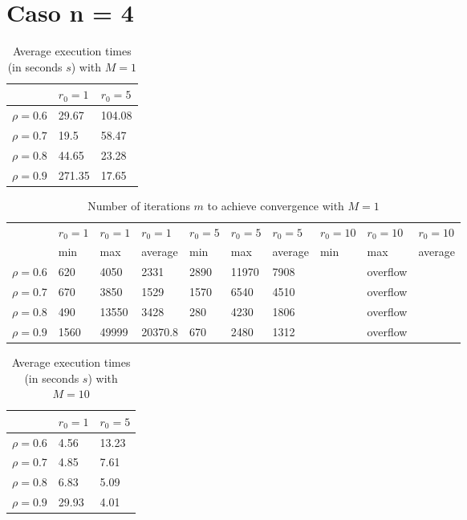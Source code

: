 \documentclass[a4paper,11pt,openright]{report}
\begin{document}
\section*{Caso n = 4} 
\begin{table}[H]
\centering
\addtolength{\leftskip}{-1.5cm}
\addtolength{\rightskip}{-1.5cm}
\begin{tabular}{|c|ll|}
\hline
$ $ & $r_0 = 1$ & $r_0 = 5$ \\
\hline
$\rho = 0.6$ & 29.67 & 104.08 \\

$\rho = 0.7$ & 19.5 & 58.47 \\

$\rho = 0.8$ & 44.65 & 23.28 \\

$\rho = 0.9$ & 271.35 & 17.65 \\
\hline
\end{tabular}
\caption{Average execution
 times (in seconds $s$) with $M = 1$}
\end{table}
\begin{table}[H]
\centering
\addtolength{\leftskip}{-1.5cm}
\addtolength{\rightskip}{-1.5cm}
\begin{tabular}{|c|lllllllll|}
\hline
$ $ & $r_0 = 1$ & $r_0 = 1$ & $r_0 = 1$ & $r_0 = 5$ & $r_0 = 5$ & $r_0 = 5$ & $r_0 = 10$ & $r_0 = 10$ & $r_0 = 10$  \\
$ $ & min & max & average & min & max & average & min & max & average \\ 
\hline
$\rho = 0.6$ & 620 & 4050 & 2331 & 2890 & 11970 & 7908 &  & overflow &  \\

$\rho = 0.7$ & 670 & 3850 & 1529 & 1570 & 6540 & 4510 &  & overflow &  \\

$\rho = 0.8$ & 490 & 13550 & 3428 & 280 & 4230 & 1806 &  & overflow & \\

$\rho = 0.9$ & 1560 & 49999 & 20370.8 & 670 & 2480 & 1312 &  & overflow & \\
\hline
\end{tabular}
\caption{Number of iterations $m$ to achieve convergence with $M = 1$}
\end{table}
\begin{table}[H]
\centering
\addtolength{\leftskip}{-1.5cm}
\addtolength{\rightskip}{-1.5cm}
\begin{tabular}{|c|ll|}
\hline
$ $ & $r_0 = 1$ & $r_0 = 5$ \\
\hline
$\rho = 0.6$ & 4.56 & 13.23  \\

$\rho = 0.7$ & 4.85 & 7.61  \\

$\rho = 0.8$ & 6.83 & 5.09  \\

$\rho = 0.9$ & 29.93 & 4.01  \\
\hline
\end{tabular}
\caption{Average execution
 times (in seconds $s$) with $M = 10$}
\end{table}
\end{document}
